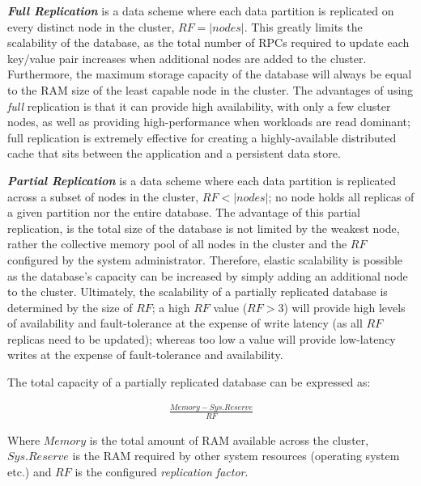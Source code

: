 	\textbf{\emph{Full Replication}} is a data scheme where each data partition is replicated on every distinct node in the cluster, $RF = \left\vert nodes \right\vert$.  This greatly limits the scalability of the database, as the total number of RPCs required to update each key/value pair increases when additional nodes are added to the cluster.  Furthermore, the maximum storage capacity of the database will always be equal to the RAM size of the least capable node in the cluster.  The advantages of using \emph{full} replication is that it can provide high availability, with only a few cluster nodes, as well as providing high-performance when workloads are read dominant; full replication is extremely effective for creating a highly-available distributed cache that sits between the application and a persistent data store.  
	
	\textbf{\emph{Partial Replication}} is a data scheme where each data partition is replicated across a subset of nodes in the cluster, $RF < \left\vert nodes \right\vert$; no node holds all replicas of a given partition nor the entire database.  The advantage of this partial replication, is the total size of the database is not limited by the weakest node, rather the collective memory pool of all nodes in the cluster and the $RF$ configured by the system administrator.  Therefore, elastic scalability is possible as the database's capacity can be increased by simply adding an additional node to the cluster.  Ultimately, the scalability of a partially replicated database is determined by the size of $RF$; a high $RF$ value ($RF > 3$) will provide high levels of availability and fault-tolerance at the expense of write latency (as all $RF$ replicas need to be updated); whereas too low a value will provide low-latency writes at the expense of fault-tolerance and availability.   
	
	The total capacity of a partially replicated database can be expressed as:
	
	\begin{equation*}
		     \begin{aligned}
		       \frac{Memory - Sys.Reserve}{RF}
		     \end{aligned}
	\end{equation*}	
	
	 Where $Memory$ is the total amount of RAM available across the cluster, $Sys.Reserve$ is the RAM required by other system resources (operating system etc.) and $RF$ is the configured \emph{replication factor}.  

